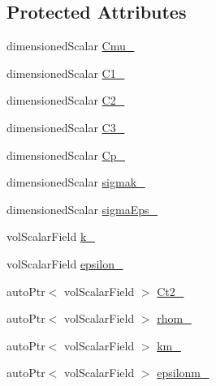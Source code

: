 \subsection*{Protected Attributes}
\begin{DoxyCompactItemize}
\item 
dimensioned\+Scalar \hyperlink{classFoam_1_1RASModels_1_1mixtureKEpsilon_aca8750ac64529f08a5e0ddbd69d538db}{Cmu\+\_\+}
\item 
dimensioned\+Scalar \hyperlink{classFoam_1_1RASModels_1_1mixtureKEpsilon_a25ef984db7a92f8f2421ed817e616206}{C1\+\_\+}
\item 
dimensioned\+Scalar \hyperlink{classFoam_1_1RASModels_1_1mixtureKEpsilon_a6ecae7b56fdac924dca1bf174f157f69}{C2\+\_\+}
\item 
dimensioned\+Scalar \hyperlink{classFoam_1_1RASModels_1_1mixtureKEpsilon_aed8039605824e63ab9ac285e15c70bb7}{C3\+\_\+}
\item 
dimensioned\+Scalar \hyperlink{classFoam_1_1RASModels_1_1mixtureKEpsilon_a928506392267e759f5e7065ea4ce1dcb}{Cp\+\_\+}
\item 
dimensioned\+Scalar \hyperlink{classFoam_1_1RASModels_1_1mixtureKEpsilon_a1c4d80e34d39e7ffccd625df6016b6f7}{sigmak\+\_\+}
\item 
dimensioned\+Scalar \hyperlink{classFoam_1_1RASModels_1_1mixtureKEpsilon_a2f26c65464368e5619b31aa5d5392a19}{sigma\+Eps\+\_\+}
\item 
vol\+Scalar\+Field \hyperlink{classFoam_1_1RASModels_1_1mixtureKEpsilon_a2166e9ffd139700fb0f21c44414e3545}{k\+\_\+}
\item 
vol\+Scalar\+Field \hyperlink{classFoam_1_1RASModels_1_1mixtureKEpsilon_a027dddd791551bd248d0fcacb013dd68}{epsilon\+\_\+}
\item 
auto\+Ptr$<$ vol\+Scalar\+Field $>$ \hyperlink{classFoam_1_1RASModels_1_1mixtureKEpsilon_aae2210cfff2c76e68e12398c3e21c717}{Ct2\+\_\+}
\item 
auto\+Ptr$<$ vol\+Scalar\+Field $>$ \hyperlink{classFoam_1_1RASModels_1_1mixtureKEpsilon_a6a1727ac1b9495fe87a3caec9ba742b1}{rhom\+\_\+}
\item 
auto\+Ptr$<$ vol\+Scalar\+Field $>$ \hyperlink{classFoam_1_1RASModels_1_1mixtureKEpsilon_a844a88970f0a98d219eac0603ecc21b6}{km\+\_\+}
\item 
auto\+Ptr$<$ vol\+Scalar\+Field $>$ \hyperlink{classFoam_1_1RASModels_1_1mixtureKEpsilon_ad5e528caf764b09f47f74b00a2a9a808}{epsilonm\+\_\+}
\end{DoxyCompactItemize}


